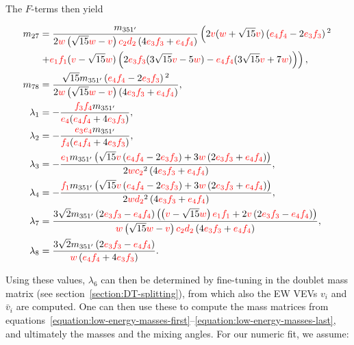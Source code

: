 \documentclass[a4paper,12pt]{article}
\def\RED{\textcolor{red}}
\begin{document}
The $F$-terms then yield

    \begin{align}
    m_{27}&= \frac{m_{351'}}{2 \RED{w} \left(\sqrt{15} \RED{w}-\RED{v}\right) \RED{c_2} \RED{d_2} \left(4 \RED{e_3} \RED{f_3}+\RED{e_4} \RED{f_4}\right)} \left(2 \RED{v}(\RED{w}+\sqrt{15} \RED{v}) \left(\RED{e_4} \RED{f_4}-2 \RED{e_3} \RED{f_3}\right){}^2\right.\nonumber\\
    &\left. +\RED{e_1} \RED{f_1}
    (\RED{v}-\sqrt{15} \RED{w}) \left(2 \RED{e_3}\RED{f_3}(3 \sqrt{15} \RED{v}-5 \RED{w})-\RED{e_4} \RED{f_4}(3 \sqrt{15} \RED{v}+7 \RED{w})\right)\right),\\
    m_{78}&= \frac{\sqrt{15} m_{351'} \left(\RED{e_4} \RED{f_4}-2 \RED{e_3} \RED{f_3}\right){}^2}{2 \RED{w}
   \left(\sqrt{15} \RED{w}-\RED{v}\right) \left(4 \RED{e_3} \RED{f_3}+\RED{e_4} \RED{f_4}\right)},\\
    \lambda _1&=-\frac{\RED{f_3} \RED{f_4} m_{351'}}{\RED{e_4} (\RED{e_4} \RED{f_4}+4 \RED{e_3} \RED{f_3})},\\
    \label{lambda2}
    \lambda _2&=-\frac{\RED{e_3} \RED{e_4} m_{351'}}{\RED{f_4} (\RED{e_4} \RED{f_4}+4 \RED{e_3} \RED{f_3})},\\
    \lambda _3&=-\frac{\RED{e_1} m_{351'} \left(\sqrt{15} \RED{v} \left(\RED{e_4} \RED{f_4}-2 \RED{e_3} \RED{f_3}\right)+3 \RED{w} \left(2 \RED{e_3} \RED{f_3}+\RED{e_4} \RED{f_4}\right)\right)}{2 \RED{w} \RED{c_2}^2 \left(4 \RED{e_3} \RED{f_3}+\RED{e_4} \RED{f_4}\right)},\\
    \lambda _4&=-\frac{\RED{f_1} m_{351'} \left(\sqrt{15} \RED{v} \left(\RED{e_4} \RED{f_4}-2 \RED{e_3} \RED{f_3}\right)+3 \RED{w} \left(2 \RED{e_3} \RED{f_3}+\RED{e_4} \RED{f_4}\right)\right)}{2 \RED{w} \RED{d_2}^2 \left(4 \RED{e_3} \RED{f_3}+\RED{e_4} \RED{f_4}\right)},\\
    \lambda _7&= \frac{3 \sqrt{2} m_{351'} \left(2 \RED{e_3} \RED{f_3}-\RED{e_4} \RED{f_4}\right) \left(\left(\RED{v}-\sqrt{15} \RED{w}\right) \RED{e_1} \RED{f_1}
    +2\RED{v}\left(2 \RED{e_3} \RED{f_3}-\RED{e_4} \RED{f_4}\right)\right)}{\RED{w} \left(\sqrt{15} \RED{w}-\RED{v}\right) \RED{c_2} \RED{d_2} \left(4 \RED{e_3} \RED{f_3}+\RED{e_4} \RED{f_4}\right)},\\
    \lambda _8&= \frac{3 \sqrt{2} m_{351'} \left(2 \RED{e_3} \RED{f_3}-\RED{e_4} \RED{f_4}\right)}{\RED{w} \left(\RED{e_4} \RED{f_4}+4 \RED{e_3} \RED{f_3}\right)}.
    \end{align}

Using these values, $\lambda_6$ can then be determined by fine-tuning in the doublet mass matrix (see section~\ref{section:DT-splitting}), from which also the EW VEVs $v_i$ and $\bar{v}_i$ are computed. One can then use these to compute the mass matrices from equations~\eqref{equation:low-energy-masses-first}--\eqref{equation:low-energy-masses-last}, and ultimately the masses and the mixing angles. For our numeric fit, we assume:
\end{document}
